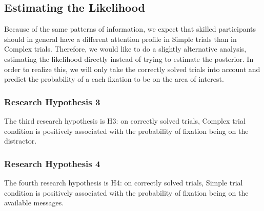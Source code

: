 \subsection{Estimating the Likelihood}
\label{sec:likelihood}

Because of the same patterns of information, we expect that skilled participants should in general have a different attention profile in Simple trials than in Complex trials. Therefore, we would like to do a slightly alternative analysis, estimating the likelihood directly instead of trying to estimate the posterior. In order to realize this, we will only take the correctly solved trials into account and predict the probability of a each fixation to be on the area of interest.

\subsubsection{Research Hypothesis 3}
\label{sec:h3}
The third research hypothesis is H3: on correctly solved trials, Complex trial condition is positively associated with the probability of fixation being on the distractor. 

\subsubsection{Research Hypothesis 4}
\label{sec:h4}
The fourth research hypothesis is H4: on correctly solved trials, Simple trial condition is positively associated with the probability of fixation being on the available messages.


